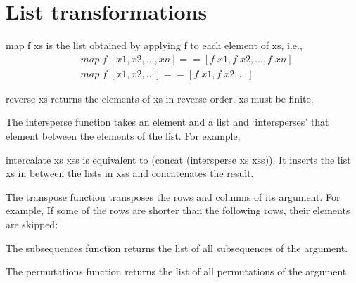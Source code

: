 \section{List transformations}

map f xs is the list obtained by applying f to each element of xs, i.e.,
\begin{align*}
	&map\; f\; [x1, x2, ..., xn] == [f\; x1, f\; x2, ..., f\; xn]\\
	&map\; f\; [x1, x2, ...] == [f\; x1, f\; x2, ...]
\end{align*}

reverse xs returns the elements of xs in reverse order. xs must be finite.

The intersperse function takes an element and a list and `intersperses' that element between the elements of the list. For example,

intercalate xs xss is equivalent to (concat (intersperse xs xss)). It inserts the list xs in between the lists in xss and concatenates the result.

The transpose function transposes the rows and columns of its argument. For example,
If some of the rows are shorter than the following rows, their elements are skipped:

The subsequences function returns the list of all subsequences of the argument.

The permutations function returns the list of all permutations of the argument.
